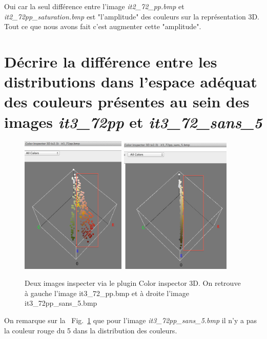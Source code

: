 \documentclass[a4paper,10pt]{article}
\begin{document}
Oui car la seul diff\'erence entre l'image \emph{it2\_72\_pp.bmp} et \emph{it2\_72pp\_saturation.bmp} est "l'amplitude" des couleurs sur la repr\'esentation 3D. Tout ce que nous avons fait c'est augmenter cette "amplitude".

\section{D\'ecrire la diff\'erence entre les distributions dans l'espace ad\'equat des couleurs pr\'esentes au sein des images \emph{it3\_72pp} et \emph{it3\_72\_sans\_5}}

\begin{figure}[ht]
\begin{center}
	\includegraphics[width=5cm]{images/it3_72pp}
	\includegraphics[width=5.3cm]{images/it3_72pp_sans_5}
\end{center}
	\caption{Deux images inspecter via le plugin Color inspector 3D. On retrouve \`a gauche l'image it3\_72\_pp.bmp et \`a droite l'image it3\_72pp\_sans\_5.bmp}
	\label{img4}
\end{figure}

On remarque sur la ~Fig.~\ref{img4} que pour l'image \emph{it3\_72pp\_sans\_5.bmp} il n'y a pas la couleur rouge du 5 dans la distribution des couleurs.
\end{document}
